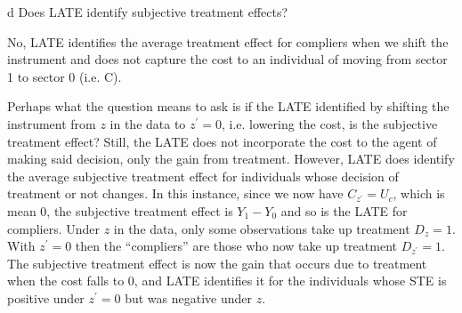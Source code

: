 \documentclass{article}
\begin{document}
\begin{problem}{d}
Does LATE identify subjective treatment effects?
\end{problem}
\begin{solution}
No, LATE identifies the average treatment effect for compliers when we shift the instrument and does not capture the cost to an individual of moving from sector 1 to sector 0 (i.e. C).

Perhaps what the question means to ask is if the LATE identified by shifting the instrument from $z$ in the data to $z^\prime=0$, i.e. lowering the cost, is the subjective treatment effect? Still, the LATE does not incorporate the cost to the agent of making said decision, only the gain from treatment. However, LATE does identify the average subjective treatment effect for individuals whose decision of treatment or not changes. In this instance, since we now have $C_{z^\prime}=U_c$, which is mean 0, the subjective treatment effect is $Y_1-Y_0$ and so is the LATE for compliers. Under $z$ in the data, only some observations take up treatment $D_z=1$. With $z^\prime=0$ then the ``compliers'' are those who now take up treatment $D_{z^\prime}=1$. The subjective treatment effect is now the gain that occurs due to treatment when the cost falls to 0, and LATE identifies it for the individuals whose STE is positive under $z^\prime=0$ but was negative under $z$.
\end{solution}
\end{document}
